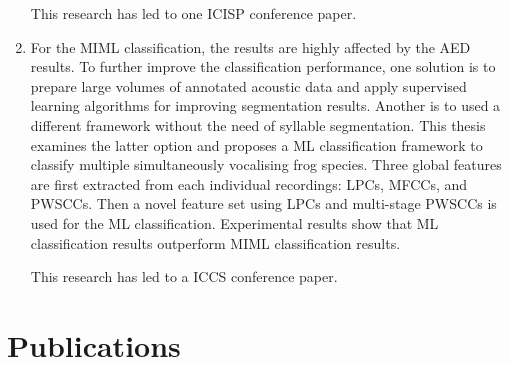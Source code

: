 \begin{enumerate}
This research has led to one ICISP conference paper.

\item For the MIML classification, the results are highly affected by the AED results. To further improve the classification performance, one solution is to prepare large volumes of annotated acoustic data and apply supervised learning algorithms for improving segmentation results. Another is to used a different framework without the need of syllable segmentation. This thesis examines the latter option and proposes a ML classification framework to classify multiple simultaneously vocalising frog species. Three global features are first extracted from each individual recordings: LPCs, MFCCs, and PWSCCs. Then a novel feature set using LPCs and multi-stage PWSCCs is used for the ML classification.
Experimental results show that ML classification results outperform MIML classification results. 

This research has led to a ICCS conference paper.


\end{enumerate}
 




\section{Publications}

